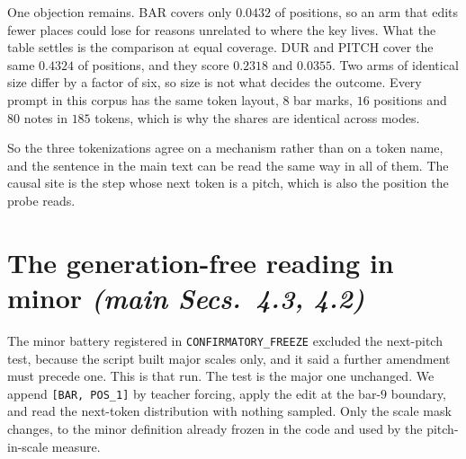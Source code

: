 \documentclass{article}
\begin{document}
One objection remains. BAR covers only $0.0432$ of positions, so an
arm that edits fewer places could lose for reasons unrelated to where the key lives.
What the table settles is the comparison at equal coverage. DUR and PITCH cover the
same $0.4324$ of positions, and they score $0.2318$ and $0.0355$. Two arms of
identical size differ by a factor of six, so size is not what decides the outcome.
Every prompt in this corpus has the same token layout, $8$ bar marks, $16$ positions
and $80$ notes in $185$ tokens, which is why the shares are identical across modes.

So the three tokenizations agree on a mechanism rather than on a token name, and the
sentence in the main text can be read the same way in all of them. The causal site is
the step whose next token is a pitch, which is also the position the probe reads.

\section{The generation-free reading in minor \normalfont\textit{(main Secs.~4.3, 4.2)}}
\label{sec:nextpitch-minor}

%
The minor battery registered in \texttt{CONFIRMATORY\_FREEZE} excluded the next-pitch
test, because the script built major scales only, and it said a further amendment must
precede one. This is that run. The test is the major one unchanged. We append
\texttt{[BAR, POS\_1]} by teacher forcing, apply the edit at the bar-$9$ boundary, and
read the next-token distribution with nothing sampled. Only the scale mask changes, to
the minor definition already frozen in the code and used by the pitch-in-scale measure.
\end{document}
